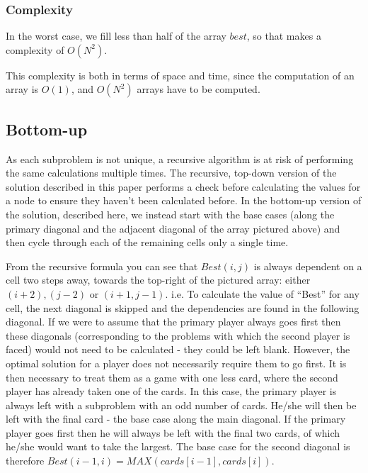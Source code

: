 \documentclass[11pt]{article}
\begin{document}
\subsubsection{Complexity}
In the worst case, we fill less than half of the array $best$, so that
makes a complexity of $O(N^2)$.

This complexity is both in terms of space and time, since the computation
of an array is $O(1)$, and $O(N^2)$ arrays have to be computed.

\subsection{Bottom-up}
As each subproblem is not unique, a recursive algorithm is at risk of performing the same calculations multiple times. The recursive, top-down version of the solution described in this paper performs a check before calculating the values for a node to ensure they haven't been calculated before. In the bottom-up version of the solution, described here, we instead start with the base cases (along the primary diagonal and the adjacent diagonal of the array pictured above) and then cycle through each of the remaining cells only a single time.

From the recursive formula you can see that $Best(i, j)$ is always dependent on a cell two steps away, towards the top-right of the pictured
array: either $(i+2), (j-2)$ or $(i+1, j-1)$. i.e. To calculate the value of ``Best'' for any cell, the next diagonal is skipped and the 
dependencies are found in the following diagonal. If we were to assume that the primary player always goes first then these diagonals 
(corresponding to the problems with which the second player is faced) would not need to be calculated - 
they could be left blank. However, the optimal solution for a player does not necessarily require them to go first. It is 
then necessary to treat them as a game with one less card, where the second player has already taken one of the cards. 
In this case, the primary player is always left with a subproblem with an odd number of cards. He/she will then 
be left with the final card - the base case along the main diagonal. If the primary player goes first then he will always 
be left with the final two cards, of which he/she would want to take the largest. The base case for the 
second diagonal is therefore $Best(i-1, i) = MAX(cards[i-1], cards[i])$.
\end{document}
